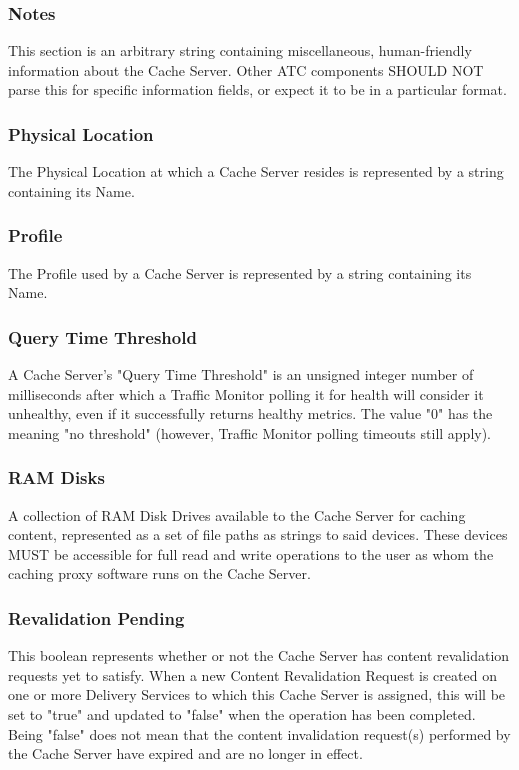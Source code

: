 \subsubsection{Notes}
This section is an arbitrary string containing miscellaneous, human-friendly
information about the Cache Server. Other ATC components SHOULD NOT parse this
for specific information fields, or expect it to be in a particular format.

\subsubsection{Physical Location}
The Physical Location at which a Cache Server resides is represented by a string
containing its Name.

\subsubsection{Profile}
The Profile used by a Cache Server is represented by a string containing its Name.

\subsubsection{Query Time Threshold}
A Cache Server's "Query Time Threshold" is an unsigned integer number of
milliseconds after which a Traffic Monitor polling it for health will consider it
unhealthy, even if it successfully returns healthy metrics. The value "0" has the
meaning "no threshold" (however, Traffic Monitor polling timeouts still apply).

\subsubsection{RAM Disks}
A collection of RAM Disk Drives available to the Cache Server for caching
content, represented as a set of file paths as strings to said devices. These
devices MUST be accessible for full read and write operations to the user as whom
the caching proxy software runs on the Cache Server.

\subsubsection{Revalidation Pending}
This boolean represents whether or not the Cache Server has content revalidation
requests yet to satisfy. When a new Content Revalidation Request is created on
one or more Delivery Services to which this Cache Server is assigned, this will
be set to "true" and updated to "false" when the operation has been completed.
Being "false" does not mean that the content invalidation request(s) performed by
the Cache Server have expired and are no longer in effect.

